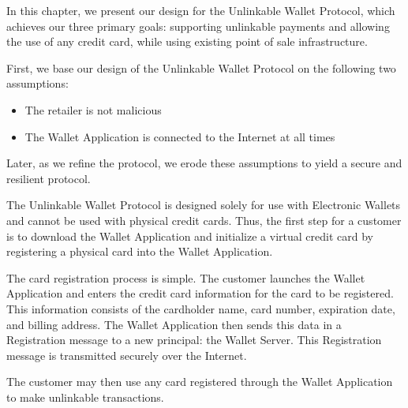 In this chapter, we present our design for the Unlinkable Wallet Protocol, which achieves our three primary goals:
    supporting unlinkable payments and allowing the use of any credit card, while using existing point of sale infrastructure.

First, we base our design of the Unlinkable Wallet Protocol on the following two assumptions:
\begin{itemize}
\item The retailer is not malicious
\item The Wallet Application is connected to the Internet at all times
\end{itemize}
Later, as we refine the protocol, we erode these assumptions to yield a secure and resilient protocol.

The Unlinkable Wallet Protocol is designed solely for use with Electronic Wallets and cannot be used with physical credit cards.
Thus, the first step for a customer is to download the Wallet Application and initialize a virtual credit card by registering a physical card into the Wallet Application.

The card registration process is simple.
The customer launches the Wallet Application and enters the credit card information for the card to be registered.
This information consists of the cardholder name, card number, expiration date, and billing address.
The Wallet Application then sends this data in a Registration message to a new principal: the Wallet Server.
This Registration message is transmitted securely over the Internet.

The customer may then use any card registered through the Wallet Application to make unlinkable transactions.
